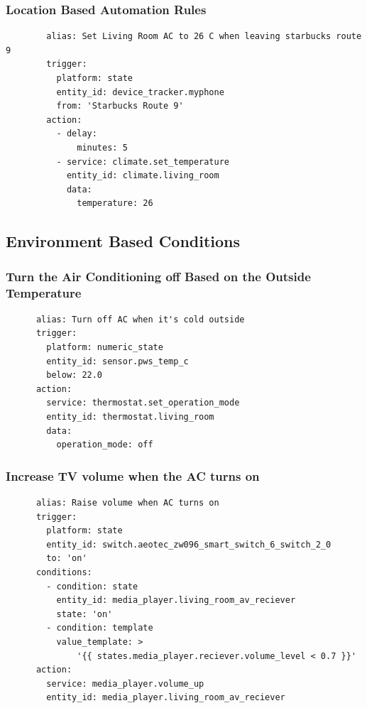 \documentclass[aspectratio=169,11pt,hyperref={colorlinks=true}]{beamer}
\begin{document}
\begin{frame}[fragile=singleslide]
    \frametitle{Location Based Automation Rules}
    \begin{verbatim}
        alias: Set Living Room AC to 26 C when leaving starbucks route 9
        trigger:
          platform: state
          entity_id: device_tracker.myphone
          from: 'Starbucks Route 9'
        action:
          - delay:
              minutes: 5
          - service: climate.set_temperature
            entity_id: climate.living_room
            data:
              temperature: 26
    \end{verbatim}
\end{frame}

\subsection{Environment Based Conditions}
\begin{frame}[fragile=singleslide]
    \frametitle{Turn the Air Conditioning off Based on the Outside Temperature}
    \begin{verbatim}
      alias: Turn off AC when it's cold outside
      trigger:
        platform: numeric_state
        entity_id: sensor.pws_temp_c
        below: 22.0
      action:
        service: thermostat.set_operation_mode
        entity_id: thermostat.living_room
        data:
          operation_mode: off
    \end{verbatim}
\end{frame}

\begin{frame}[fragile=singleslide]
    \frametitle{Increase TV volume when the AC turns on}
    \begin{verbatim}
      alias: Raise volume when AC turns on
      trigger:
        platform: state
        entity_id: switch.aeotec_zw096_smart_switch_6_switch_2_0
        to: 'on'
      conditions:
        - condition: state
          entity_id: media_player.living_room_av_reciever
          state: 'on'
        - condition: template
          value_template: >
              '{{ states.media_player.reciever.volume_level < 0.7 }}'
      action:
        service: media_player.volume_up
        entity_id: media_player.living_room_av_reciever
    \end{verbatim}
\end{frame}
\end{document}
